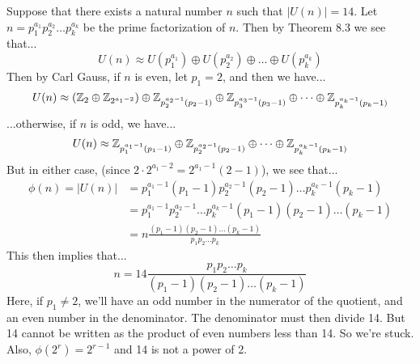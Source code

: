 \documentclass{article}
\begin{document}
Suppose that there exists a natural number $n$ such that $|U(n)|=14$.
Let $n=p_1^{a_1}p_2^{a_2}\dots p_k^{a_k}$ be the prime factorization of $n$.
Then by Theorem 8.3 we see that...
\begin{equation*}
U(n)\approx U(p_1^{a_1})\oplus U(p_2^{a_2})\oplus\dots\oplus U(p_k^{a_k})
\end{equation*}
Then by Carl Gauss, if $n$ is even, let $p_1=2$, and then we have...
\begin{equation*}
U(n)\approx(\mathbb{Z}_2\oplus\mathbb{Z}_{2^{a_1-2}})\oplus\mathbb{Z}_{p_2^{a_2-1}(p_2-1)}\oplus
\mathbb{Z}_{p_3^{a_3-1}(p_3-1)}\oplus\dots\oplus\mathbb{Z}_{p_k^{a_k-1}(p_k-1)}
\end{equation*}
...otherwise, if $n$ is odd, we have...
\begin{equation*}
U(n)\approx\mathbb{Z}_{p_1^{a_1-1}(p_1-1)}\oplus
\mathbb{Z}_{p_2^{a_2-1}(p_2-1)}\oplus\dots\oplus\mathbb{Z}_{p_k^{a_k-1}(p_k-1)}
\end{equation*}
But in either case, (since $2\cdot 2^{a_1-2}=2^{a_1-1}(2-1)$), we see that...
\begin{align*}
\phi(n)=|U(n)| &= p_1^{a_1-1}(p_1-1)p_2^{a_2-1}(p_2-1)\dots p_k^{a_k-1}(p_k-1) \\
 &= p_1^{a_1-1}p_2^{a_2-1}\dots p_k^{a_k-1}(p_1-1)(p_2-1)\dots(p_k-1) \\
 &= n\frac{(p_1-1)(p_2-1)\dots(p_k-1)}{p_1p_2\dots p_k}
\end{align*}
This then implies that...
\begin{equation*}
n = 14\frac{p_1p_2\dots p_k}{(p_1-1)(p_2-1)\dots(p_k-1)}
\end{equation*}
Here, if $p_1\neq 2$, we'll have an odd number in the numerator
of the quotient, and an even number in the denominator.  The denominator
must then divide 14.  But 14 cannot be written as the product of even
numbers less than 14.  So we're stuck.  Also, $\phi(2^r)=2^{r-1}$ and
14 is not a power of 2.
\end{document}
